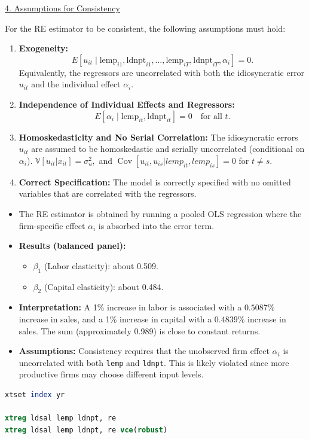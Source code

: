 \documentclass[a4paper,12pt]{article} %
\theoremstyle{nonitalic}
\newenvironment{solution}[1]
  {\renewcommand\theinnercustomsol{#1}\innercustomsol}
  {\endinnercustomsol}
\newcounter{solutionctr}
\renewcommand{\thesolutionctr}{(\alph{solutionctr})}
\newenvironment{autosolution}
  {\stepcounter{solutionctr}\begin{solution}{\thesolutionctr}}
  {\end{solution}}
\begin{document}
\begin{autosolution}
\underline{4. Assumptions for Consistency}

For the RE estimator to be consistent, the following assumptions must hold:
\begin{enumerate}
    \item \textbf{Exogeneity:} 
    \[
    E\left[u_{it} \mid \text{lemp}_{i1}, \text{ldnpt}_{i1}, \dots, \text{lemp}_{iT}, \text{ldnpt}_{iT}, \alpha_i\right] = 0.
    \]
    Equivalently, the regressors are uncorrelated with both the idiosyncratic error $u_{it}$ and the individual effect $\alpha_i$.
    
    \item \textbf{Independence of Individual Effects and Regressors:}
    \[
    E\left[\alpha_i \mid \text{lemp}_{it}, \text{ldnpt}_{it}\right] = 0 \quad \text{for all } t.
    \]
    
    \item \textbf{Homoskedasticity and No Serial Correlation:}  
    The idiosyncratic errors $u_{it}$ are assumed to be homoskedastic and serially uncorrelated (conditional on $\alpha_i$).
    $\mathbb{V}[u_{it} | x_{it}] = \sigma_u^2,$ and $\operatorname{Cov}[u_{it}, u_{is} | lemp_{it}, lemp_{is}] = 0$ for $t \neq s$.

    \item \textbf{Correct Specification:}  
    The model is correctly specified with no omitted variables that are correlated with the regressors.
\end{enumerate}

\begin{itemize}
    \item The RE estimator is obtained by running a pooled OLS regression where the firm-specific effect $\alpha_i$ is absorbed into the error term.
    \item \textbf{Results (balanced panel):}
    
    \begin{itemize}
        \item $\beta_1$ (Labor elasticity): about 0.509.
        \item $\beta_2$ (Capital elasticity): about 0.484.
    \end{itemize}
    \item \textbf{Interpretation:} A 1\% increase in labor is associated with a $0.5087\%$ increase in sales, and a 1\% increase in capital with a $0.4839\%$ increase in sales. The sum (approximately 0.989) is close to constant returns.
    \item \textbf{Assumptions:} Consistency requires that the unobserved firm effect $\alpha_i$ is uncorrelated with both \texttt{lemp} and \texttt{ldnpt}. This is likely violated since more productive firms may choose different input levels.
\end{itemize}

\begin{lstlisting}[language=Stata]
xtset index yr

xtreg ldsal lemp ldnpt, re
xtreg ldsal lemp ldnpt, re vce(robust)
\end{lstlisting}

\end{autosolution}
\end{document}
